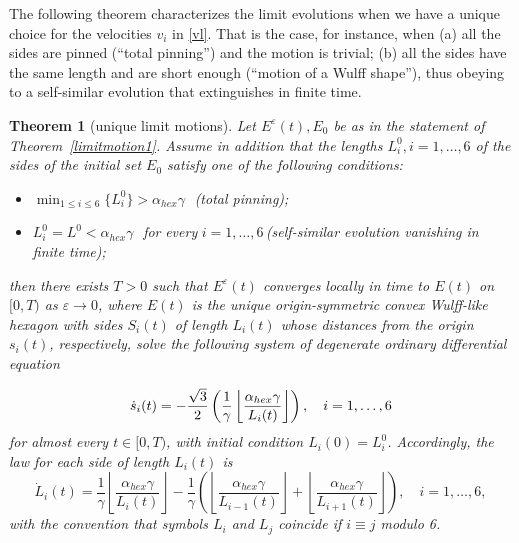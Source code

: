 \documentclass{interact}
\numberwithin{equation}{section}
\newtheorem{thm}{Theorem}[section]
\theoremstyle{definition}
\renewcommand{\epsilon}{\varepsilon}
\begin{document}
The following theorem characterizes the limit evolutions when we have a unique choice for the velocities $v_i$ in \eqref{vl}. That is the case, for instance, when (a) all the sides are pinned (``total pinning'') and the motion is trivial; (b) all the sides have the same length and are short enough (``motion of a Wulff shape''), thus obeying to a self-similar evolution that extinguishes in finite time. 


\begin{thm}[unique limit motions]\label{unilimitmotion}
Let $E^\epsilon(t),E_0$ be as in the statement of Theorem~{\rm \ref{limitmotion1}}. Assume in addition that the lengths $L_i^0, i=1,\dots,6$ of the sides of the initial set $E_0$ satisfy one of the following conditions:
\begin{itemize}
\item[\emph{(a)}] $\displaystyle\min_{1\leq i\leq6}\{L_i^0\}>\alpha_{hex}\gamma$\,\, {\rm (total pinning);}
\item[\emph{(b)}] $L_i^0= L^0<\alpha_{hex}\gamma$ \,\,{\rm for\,\,every\,\,}$i=1,\dots,6$\,{\rm (self-similar evolution vanishing in finite time);} 
\end{itemize}
then there exists $T>0$ such that $E^\epsilon(t)$ converges locally in time to $E(t)$ on $[0,T)$ as $\epsilon\to 0$, where $E(t)$ is the unique origin-symmetric convex Wulff-like hexagon with sides $S_i(t)$ of length $L_i(t)$ whose distances from the origin $s_i(t)$, respectively, solve the following system of degenerate ordinary differential equation

\begin{equation}\label{unita}
\dot{s}_i(t)=-\frac{\sqrt{3}}{2}\left({1\over \gamma}\left\lfloor\frac{\alpha_{hex}\gamma}{L_{i}(t)}\right\rfloor\right), \quad i=1,\dots,6
\end{equation}
for almost every $t\in[0,T)$, with initial condition $L_i(0)=L_i^0$. Accordingly, the law for each side of length $L_i(t)$ is
\begin{equation}\label{system3bis}
\dot{L}_i(t)=\frac{1}{\gamma}\left\lfloor\frac{\alpha_{hex}\gamma}{L_{i}(t)}\right\rfloor-\frac{1}{\gamma}\left(\left\lfloor\frac{\alpha_{hex}\gamma}{L_{i-1}(t)}\right\rfloor+\left\lfloor\frac{\alpha_{hex}\gamma}{L_{i+1}(t)}\right\rfloor\right),\quad i=1,\dots,6,
\end{equation}
with the convention that symbols $L_i$ and $L_j$ coincide if $i\equiv j$ modulo 6.
\end{thm}
\end{document}
